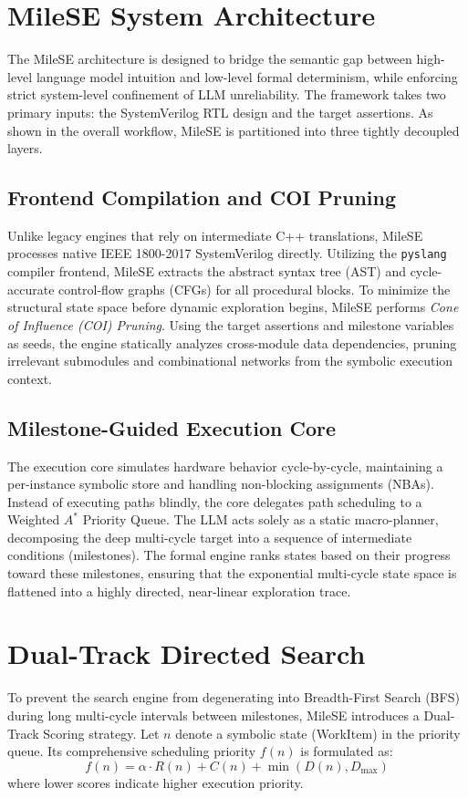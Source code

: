 \section{MileSE System Architecture}
\label{sec:architecture}
The MileSE architecture is designed to bridge the semantic gap between high-level language model intuition and low-level formal determinism, while enforcing strict system-level confinement of LLM unreliability. The framework takes two primary inputs: the SystemVerilog RTL design and the target assertions. As shown in the overall workflow, MileSE is partitioned into three tightly decoupled layers.

\subsection{Frontend Compilation and COI Pruning}
Unlike legacy engines that rely on intermediate C++ translations, MileSE processes native IEEE 1800-2017 SystemVerilog directly. Utilizing the \texttt{pyslang} compiler frontend, MileSE extracts the abstract syntax tree (AST) and cycle-accurate control-flow graphs (CFGs) for all procedural blocks. To minimize the structural state space before dynamic exploration begins, MileSE performs \textit{Cone of Influence (COI) Pruning}. Using the target assertions and milestone variables as seeds, the engine statically analyzes cross-module data dependencies, pruning irrelevant submodules and combinational networks from the symbolic execution context.

\subsection{Milestone-Guided Execution Core}
The execution core simulates hardware behavior cycle-by-cycle, maintaining a per-instance symbolic store and handling non-blocking assignments (NBAs). Instead of executing paths blindly, the core delegates path scheduling to a Weighted $A^*$ Priority Queue. The LLM acts solely as a static macro-planner, decomposing the deep multi-cycle target into a sequence of intermediate conditions (milestones). The formal engine ranks states based on their progress toward these milestones, ensuring that the exponential multi-cycle state space is flattened into a highly directed, near-linear exploration trace.

\section{Dual-Track Directed Search}
\label{sec:search}
To prevent the search engine from degenerating into Breadth-First Search (BFS) during long multi-cycle intervals between milestones, MileSE introduces a Dual-Track Scoring strategy. Let $n$ denote a symbolic state (WorkItem) in the priority queue. Its comprehensive scheduling priority $f(n)$ is formulated as:
\begin{equation}
    f(n) = \alpha \cdot R(n) + C(n) + \min(D(n), D_{\max})
\end{equation}
where lower scores indicate higher execution priority.

